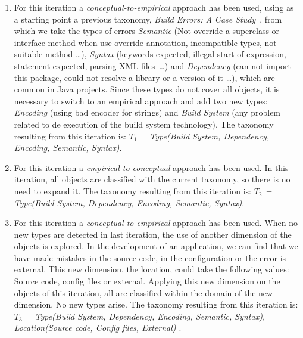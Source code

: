 \begin{enumerate}%
	
	\item For this iteration a \textit{conceptual-to-empirical} approach has been used, using as a starting point a previous taxonomy, \textit{Build Errors: A Case Study}~\cite{Seo:2014:PBE:2568225.2568255}, from which we take the types of errors \textit{Semantic} (Not override a superclass or interface method when use override annotation, incompatible types, not suitable method \dots), \textit{Syntax} (keywords expected, illegal start of expression, statement expected, parsing XML files~\dots) and \textit{Dependency} (can not import this package, could not resolve a library or a version of it \dots), which are common in Java projects. Since these types do not cover all objects, it is necessary to switch to an empirical approach and add two new types: \textit{Encoding} (using bad encoder for strings) and \textit{Build System} (any problem related to de execution of the build system technology). The taxonomy resulting from this iteration is: \textit{$T_{1}$ = {Type(Build System, Dependency, Encoding, Semantic, Syntax)}}.
	
	\vspace{2mm}
	\item For this iteration a \textit{empirical-to-conceptual} approach has been used. In this iteration, all objects are classified with the current taxonomy, so there is no need to expand it. The taxonomy resulting from this iteration is: \textit{$T_{2}$ = {Type(Build System, Dependency, Encoding, Semantic, Syntax)}}.
	
	\vspace{2mm}
	\item For this iteration a \textit{conceptual-to-empirical} approach has been used. When no new types are detected in last iteration, the use of another dimension of the objects is explored. In the development of an application, we can find that we have made mistakes in the source code, in the configuration or the error is external. This new dimension, the location, could take the following values: Source code, config files or external. Applying this new dimension on the objects of this iteration, all are classified within the domain of the new dimension. No new types arise. The taxonomy resulting from this iteration is: \textit{$T_{3}$ = {Type(Build System, Dependency, Encoding, Semantic, Syntax), Location(Source code, Config files, External) }}.
	

\end{enumerate}
